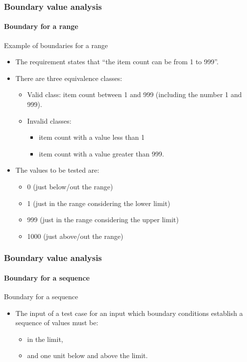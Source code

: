 \begin{frame}
\frametitle{Boundary value analysis}
\framesubtitle{Boundary for a range}

\begin{block}{Example of boundaries for a range}
\begin{itemize}
	\item The requirement states that ``the item count can be from 1 to 999''.

	\item There are three equivalence classes:
	\begin{itemize}
		\item Valid class: item count between 1 and 999 (including the number
		1 and 999).
		\item Invalid classes:
		\begin{itemize}
			\item item count with a value less than 1
			\item item count with a value greater than 999.
		\end{itemize}
	\end{itemize}

	\item The values to be tested are:
	\begin{itemize}
		\item 0 (just below/out the range)
		\item 1 (just in the range considering the lower limit)
		\item 999 (just in the range considering the upper limit)
		\item 1000 (just above/out the range)
	\end{itemize}
\end{itemize}
\end{block}
\end{frame}



\begin{frame}
\frametitle{Boundary value analysis}
\framesubtitle{Boundary for a sequence}

\begin{block:fact}{Boundary for a sequence}
\begin{itemize}
	\item The input of a test case for an input which boundary conditions
	establish a sequence of values must be:
	\begin{itemize}
		\item in the limit,
		\item and one unit below and above the limit.
	\end{itemize}
\end{itemize}
\end{block:fact}
\end{frame}


